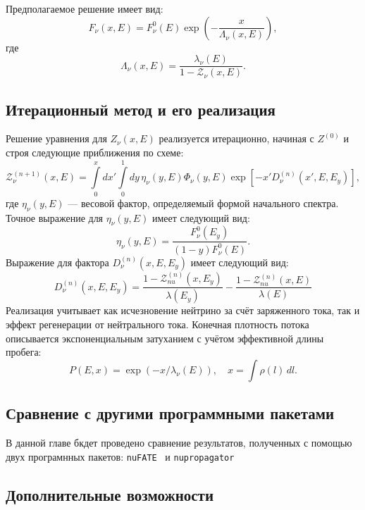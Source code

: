 Предполагаемое решение имеет вид:
\begin{equation}
F_{\nu}(x,E) = F^{0}_{\nu}(E)\exp\left(-\frac{x}{\Lambda_{\nu}(x,E)}\right),
\end{equation}
где 
\begin{equation}
\Lambda_{\nu}(x,E) = \frac{\lambda_{\nu}(E)}{1 - \mathcal{Z}_{\nu}(x,E)}.
\end{equation}

\subsection{Итерационный метод и его реализация}

Решение уравнения для $Z_{\nu}(x,E)$ реализуется итерационно, начиная с $Z^{(0)}$ и строя следующие приближения по схеме:
\begin{equation}
\mathcal{Z}^{(n+1)}_{\nu}(x,E) = \int\limits_0^x dx' \int\limits_0^1 dy\,\eta_{\nu}(y,E)\Phi_{\nu}(y,E)\exp\left[ -x'D^{(n)}_{\nu}(x',E,E_y) \right],
\end{equation}
где $\eta_{\nu}(y,E)$ — весовой фактор, определяемый формой начального спектра. Точное выражение для $\eta_{\nu}(y,E)$ имеет следующий вид: 
\begin{equation}
    \eta_{\nu}(y,E) = \frac{F^0_{\nu}(E_y)}{(1-y)F^0_{\nu}(E)}.
\end{equation}
Выражение для фактора $D^{(n)}_{\nu}(x, E, E_y)$ имеет следующий вид:
\begin{equation}
    D^{(n)}_{\nu}(x, E, E_y) = \frac{1-\mathcal{Z}_{nu}^{(n)}(x, E_y)}{\lambda(E_y)} - \frac{1-\mathcal{Z}_{nu}^{(n)}(x, E)}{\lambda(E)}
\end{equation}
Реализация учитывает как исчезновение нейтрино за счёт заряженного тока, так и эффект регенерации от нейтрального тока. Конечная плотность потока описывается экспоненциальным затуханием с учётом эффективной длины пробега:
\begin{equation}
P(E,x) = \exp(-x/\lambda_{\nu}(E)), \quad x = \int\rho(l)\,dl.
\end{equation}
\subsection{Сравнение с другими программными пакетами}
В данной главе бкдет проведено сравнение результатов, полученных с помощью двух програмнных пакетов: \texttt{nuFATE}~\cite{Vincent_2017} и \texttt{nupropagator}
\subsection{Дополнительные возможности}

